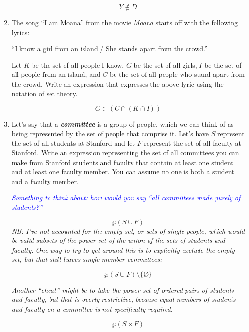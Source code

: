 \documentclass{article}
\renewcommand{\(}{\left(}
\renewcommand{\)}{\right)}
\renewcommand{\emptyset}{\text{\O}}
\theoremstyle{plain}
\theoremstyle{plain}
\theoremstyle{definition}
\begin{document}
\begin{enumerate}[label*=\roman*.,ref=\roman*]
\begin{shaded}
\begin{equation*}
	Y \notin D
\end{equation*}
\end{shaded}

\item The song ``I am Moana'' from the movie \textit{Moana} starts off with the following lyrics: 
\begin{center}
    ``I know a girl from an island / She stands apart from the crowd.''
\end{center}
Let $K$ be the set of all people I know, $G$ be the set of all girls, $I$ be the set of all people from an island, and $C$ be the set of all people who stand apart from the crowd. Write an expression that expresses the above lyric using the notation of set theory. 

\begin{shaded}
\begin{equation*}
	G \in (C \cap (K \cap I))
\end{equation*}
\end{shaded}

\item Let's say that a \textit{\textbf{committee}} is a group of people, which we can think of as being represented by the set of people that comprise it. Let's have $S$ represent the set of all students at Stanford and let $F$ represent the set of all faculty at Stanford. Write an expression representing the set of all committees you can make from Stanford students and faculty that contain at least one student and at least one faculty member. You can assume no one is both a student and a faculty member.

\textit{\textcolor{blue}{Something to think about: how would you say ``all committees made purely of students?'' }}

\begin{shaded}
\begin{equation*}
	\wp(S \cup F)
\end{equation*}
\textit{NB: I've not accounted for the empty set, or sets of single people, which would be valid subsets of the power set of the union of the sets of students and faculty. One way to try to get around this is to explicitly exclude the empty set, but that still leaves single-member committees:}

\begin{equation*}
\wp(S \cup F)\setminus \{\emptyset\}
\end{equation*}

\textit{Another ``cheat'' might be to take the power set of ordered pairs of students and faculty, but that is overly restrictive, because equal numbers of students and faculty on a committee is not specifically required.}

\begin{equation*}
\wp(S \times F)
\end{equation*}
\end{shaded}

\end{enumerate}
\end{document}
